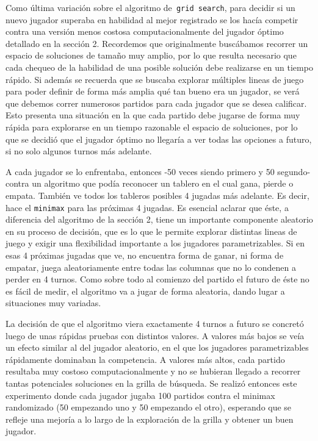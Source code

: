 \documentclass[A4paper,oneside,fleqn,11pt]{article}
\theoremstyle{definition}
\begin{document}
Como última variación sobre el algoritmo de\texttt{ grid search}, para decidir si un nuevo jugador superaba en habilidad al mejor registrado se los hacía competir contra una versión menos costosa computacionalmente del jugador óptimo detallado en la sección 2. Recordemos que originalmente buscábamos recorrer un espacio de soluciones de tamaño muy amplio, por lo que resulta necesario que cada chequeo de la habilidad de una posible solución debe realizarse en un tiempo rápido. Si además se recuerda que se buscaba explorar múltiples lineas de juego para poder definir de forma más amplia qué tan bueno era un jugador, se verá que debemos correr numerosos partidos para cada jugador que se desea calificar. Esto presenta una situación en la que cada partido debe jugarse de forma muy rápida para explorarse en un tiempo razonable el espacio de soluciones, por lo que se decidió que el jugador óptimo no llegaría a ver todas las opciones a futuro, si no solo algunos turnos más adelante.

A cada jugador se lo enfrentaba, entonces -50 veces siendo primero y 50 segundo- contra un algoritmo que podía reconocer un tablero en el cual gana, pierde o empata. También ve todos los tableros posibles 4 jugadas más adelante. Es decir, hace el \texttt{minimax} para las próximas 4 jugadas. Es esencial aclarar que éste, a diferencia del algoritmo de la sección 2, tiene un importante componente aleatorio en su proceso de decisión, que es lo que le permite explorar distintas lineas de juego y exigir una flexibilidad importante a los jugadores parametrizables. Si en esas 4 próximas jugadas que ve, no encuentra forma de ganar, ni forma de empatar, juega aleatoriamente entre todas las columnas que no lo condenen a perder en 4 turnos. Como sobre todo al comienzo del partido el futuro de éste no es fácil de medir, el algoritmo va a jugar de forma aleatoria, dando lugar a situaciones muy variadas.

La decisión de que el algoritmo viera exactamente 4 turnos a futuro se concretó luego de unas rápidas pruebas con distintos valores. A valores más bajos se veía un efecto similar al del jugador aleatorio, en el que los jugadores parametrizables rápidamente dominaban la competencia. A valores más altos, cada partido resultaba muy costoso computacionalmente y no se hubieran llegado a recorrer tantas potenciales soluciones en la grilla de búsqueda. Se realizó entonces este experimento donde cada jugador jugaba 100 partidos contra el minimax randomizado (50 empezando uno y 50 empezando el otro), esperando que se refleje una mejoría a lo largo de la exploración de la grilla y obtener un buen jugador.
\end{document}
